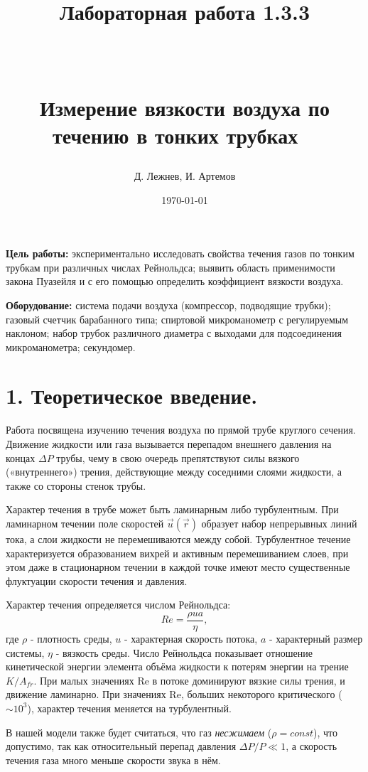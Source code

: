 \documentclass[a4paper]{article}
\begin{document}
\title{\textbf{Лабораторная работа 1.3.3}

\

Измерение вязкости воздуха по течению в тонких трубках
\
}
\author{Д. Лежнев, И. Артемов}
\date{\today}
\maketitle
\noindent
\textbf{Цель работы:} экспериментально исследовать свойства течения газов по тонким трубкам при различных числах Рейнольдса; выявить область применимости закона Пуазейля и с его помощью определить коэффициент вязкости воздуха.

\noindent
\textbf{Оборудование:} система подачи воздуха (компрессор, подводящие трубки); газовый счетчик барабанного типа; спиртовой микроманометр с регулируемым наклоном; набор трубок различного диаметра с выходами для подсоединения микроманометра; секундомер.

\section*{1. Теоретическое введение.}
Работа посвящена изучению течения воздуха по прямой трубе круглого сечения. Движение жидкости или газа вызывается перепадом внешнего давления на концах $\Delta P$ трубы, чему в свою очередь препятствуют силы вязкого
(«внутреннего») трения, действующие между соседними слоями жидкости, а также со стороны стенок трубы.

\noindent
Характер течения в трубе может быть ламинарным либо турбулентным.
При ламинарном течении поле скоростей $\vec{u}(\vec{r})$ образует набор непрерывных
линий тока, а слои жидкости не перемешиваются между собой. Турбулентное течение характеризуется образованием вихрей и активным перемешиванием слоев, при этом даже в стационарном течении в каждой точке имеют место существенные флуктуации скорости течения и давления.

\noindent
Характер течения определяется числом Рейнольдса:
\[Re = \frac{\rho u a}{\eta} ,\]
где $\rho$ - плотность среды, $u$ - характерная скорость потока, $a$ - характерный размер системы, $\eta$ - вязкость среды. Число Рейнольдса показывает отношение кинетической энергии элемента объёма жидкости к потерям энергии на трение $K/A_{fr}$. При малых значениях Re в потоке доминируют вязкие силы трения, и движение ламинарно. При значениях Re, больших некоторого критического ($\sim 10^3$), характер течения меняется на турбулентный.

\noindent
В нашей модели также будет считаться, что газ \textit{несжимаем} ($\rho = const$), что допустимо, так как относительный перепад давления $\Delta P/P \ll 1$, а скорость течения газа много меньше  скорости звука в нём.
\end{document}
